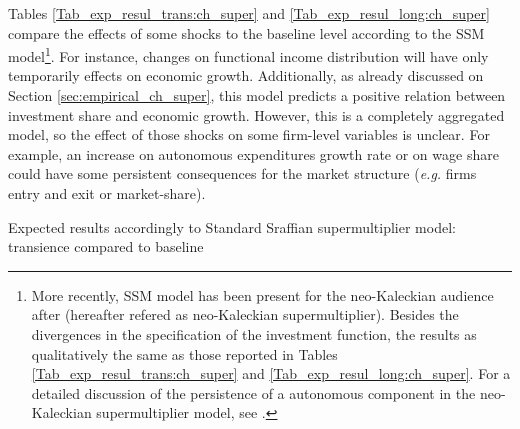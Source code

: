 \documentclass{SelfArx}
\begin{document}
Tables \ref{Tab_exp_resul_trans:ch_super} and \ref{Tab_exp_resul_long:ch_super} compare the effects of some shocks to the baseline level according to the SSM model\footnote{More recently, SSM model has been present for the neo-Kaleckian audience after \textcite{allain_2015_Tacklin,lavoie_2016_Convergence} (hereafter refered as neo-Kaleckian supermultiplier). Besides the divergences in the specification of the investment function, the results as qualitatively the same as those reported in Tables \ref{Tab_exp_resul_trans:ch_super} and \ref{Tab_exp_resul_long:ch_super}. For a detailed discussion of the persistence of a autonomous component in the neo-Kaleckian supermultiplier model, see \cite{fagundes_2017_Role}.}.
For instance, changes on functional income distribution will have only temporarily effects on economic growth.
Additionally, as already discussed on Section \ref{sec:empirical_ch_super}, this model predicts a positive relation between investment share and economic growth.
However, this is a completely aggregated model, so the effect of those shocks on some firm-level variables is unclear.
For example, an increase on autonomous expenditures growth rate or on wage share could have some persistent consequences for the market structure (\emph{e.g.} firms entry and exit or market-share).



\begin{table*}\centering
\caption{Expected results accordingly to Standard Sraffian supermultiplier model: transience compared to baseline}
\label{Tab_exp_resul_trans:ch_super}
\caption*{\textbf{Source:} Authors' elaboration}
\end{table*}
\end{document}
